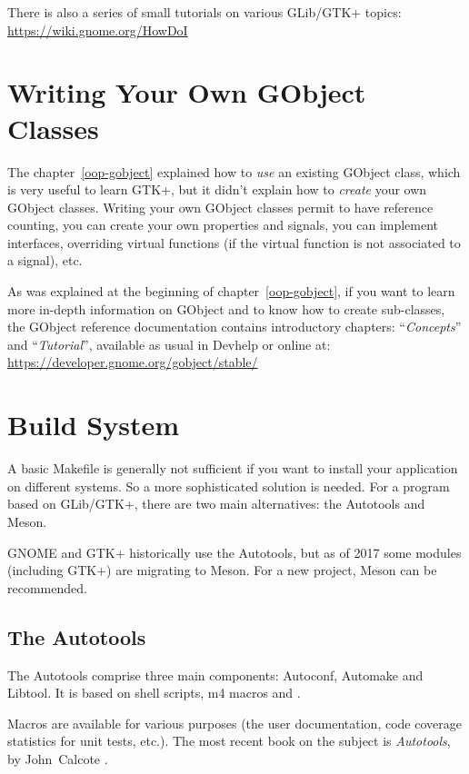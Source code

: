 There is also a series of small tutorials on various GLib/GTK+ topics:\\
\url{https://wiki.gnome.org/HowDoI}

\section{Writing Your Own GObject Classes}

The chapter~\ref{oop-gobject} explained how to \emph{use} an existing GObject class, which is very useful to learn GTK+, but it didn't explain how to \emph{create} your own GObject classes. Writing your own GObject classes permit to have reference counting, you can create your own properties and signals, you can implement interfaces, overriding virtual functions (if the virtual function is not associated to a signal), etc.

As was explained at the beginning of chapter~\ref{oop-gobject}, if you want to learn more in-depth information on GObject and to know how to create sub-classes, the GObject reference documentation contains introductory chapters: ``\emph{Concepts}'' and ``\emph{Tutorial}'', available as usual in Devhelp or online at:\\
\url{https://developer.gnome.org/gobject/stable/}

\section{Build System}

A basic Makefile is generally not sufficient if you want to install your application on different systems. So a more sophisticated solution is needed. For a program based on GLib/GTK+, there are two main alternatives: the Autotools and Meson.

GNOME and GTK+ historically use the Autotools, but as of 2017 some modules (including GTK+) are migrating to Meson. For a new project, Meson can be recommended.

\subsection{The Autotools}

The Autotools comprise three main components: Autoconf, Automake and Libtool. It is based on shell scripts, m4 macros and .

Macros are available for various purposes (the user documentation, code coverage statistics for unit tests, etc.). The most recent book on the subject is \emph{Autotools}, by John~Calcote \cite{autotools}.

